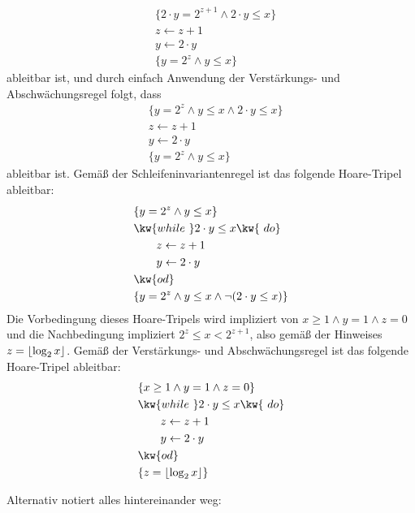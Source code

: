 \documentclass[12pt]{article}
\DeclarePairedDelimiter\floor{\lfloor}{\rfloor}
\begin{document}
\begin{loesung}
  \begin{align*}
    & \{ 2 \cdot y = 2^{z + 1} \land 2 \cdot y \leq x \} \\
    & z \gets z + 1 \\
    & y \gets 2 \cdot y \\
    & \{ y = 2^z \land y \leq x \}
  \end{align*}
  ableitbar ist, und durch einfach Anwendung der Verstärkungs- und Abschwächungsregel folgt, dass
  \begin{align*}
    & \{ y = 2^z \land y \leq x \land 2 \cdot y \leq x \} \\
    & z \gets z + 1 \\
    & y \gets 2 \cdot y \\
    & \{ y = 2^z \land y \leq x \}
  \end{align*}
  ableitbar ist. Gemäß der Schleifeninvariantenregel ist das folgende Hoare-Tripel ableitbar:
  \begin{align*}
    & \{ y = 2^z \land y \leq x \} \\
    & \kw{while\ } 2 \cdot y \leq x \kw{\ do} \\
    & \qquad z \gets z + 1 \\
    & \qquad y \gets 2 \cdot y \\
    & \kw{od} \\
    & \{ y = 2^z \land y \leq x \land \neg (2 \cdot y \leq x) \}
  \end{align*}
  Die Vorbedingung dieses Hoare-Tripels wird impliziert von $x \geq 1 \land y = 1 \land z = 0$ und die Nachbedingung impliziert $2^z \leq x < 2^{z + 1}$, also gemäß der Hinweises $z = \floor{\log_2 x}$. Gemäß der Verstärkungs- und Abschwächungsregel ist das folgende Hoare-Tripel ableitbar:
  \begin{align*}
    & \{ x \geq 1 \land y = 1 \land z = 0 \} \\
    & \kw{while\ } 2 \cdot y \leq x \kw{\ do} \\
    & \qquad z \gets z + 1 \\
    & \qquad y \gets 2 \cdot y \\
    & \kw{od} \\
    & \{ z = \floor{\log_2 x} \}
  \end{align*}

  Alternativ notiert alles hintereinander weg:


\end{loesung}
\end{document}
